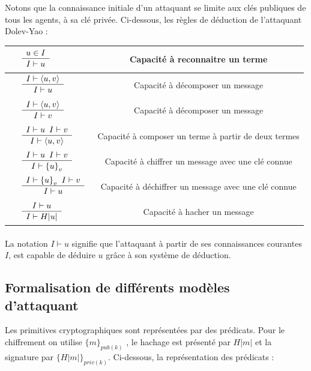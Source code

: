 \documentclass[10pt,a4paper]{article}
\newcommand{\VERT}[1]{{\color{green}#1}}
\newcommand{\bl}[1]{\textcolor{black}{#1}}
\newcommand{\inferLabel}[3]{\bl{
    \begin{array}{cc}
    {\VERT{#1}} \quad
    \begin{array}{c}
      #2\\
      \hline \noalign{\vskip 1pt}#3
    \end{array}
  \end{array}
  }}
\begin{document}
Notons que la connaissance initiale d’un attaquant se limite aux clés publiques de tous les agents, à sa clé privée. Ci-dessous, les règles de déduction de l'attaquant Dolev-Yao :\newline
\begin{center}
\begin{tabular}{|l|c|}
  \hline
  $\inferLabel{}{ u \in I}{I\vdash u}$ & Capacité à reconnaitre un terme \\
  \hline
  $\inferLabel{}{ I \vdash \langle u,v \rangle}{I\vdash u}$ & Capacité à décomposer un message  \\
  \hline
  $\inferLabel{}{ I \vdash \langle u,v \rangle}{I\vdash v}$ & Capacité à décomposer un message \\
  \hline
  $\inferLabel{}{ I \vdash u \hspace{5pt} I \vdash v }{I \vdash \langle u,v \rangle}$ & Capacité  à  composer  un  terme  à  partir  de  deux termes \\
  \hline
  $\inferLabel{}{ I \vdash u \hspace{5pt} I \vdash v }{I \vdash {\lbrace u \rbrace}_{v}}$ & Capacité  à  chiffrer  un  message  avec  une  clé connue \\
  \hline
  $\inferLabel{}{ I \vdash {\lbrace u \rbrace}_{v} \hspace{5pt} I \vdash v }{I \vdash u}$ & Capacité  à  déchiffrer  un  message  avec  une  clé connue \\
  \hline
    $\inferLabel{}{ I \vdash u }{I \vdash H|u|}$ & Capacité  à  hacher un message \\
  \hline
\end{tabular}
\end{center}
\medskip

\paragraph{}
La notation $I \vdash u$ signifie que l’attaquant à partir de ses connaissances courantes $I$,
est capable de déduire $u$ grâce à son système de déduction.
  
\subsection{Formalisation de différents modèles d'attaquant}
Les primitives cryptographiques sont représentées par des prédicats. Pour le chiffrement on utilise ${\lbrace m\rbrace}_{pub(k)}$ , le hachage est présenté par $H|m|$ et la signature par ${\lbrace H|m|\rbrace}_{priv(k)}$. Ci-dessous, la représentation des prédicats :\newpage
  
\end{document}
